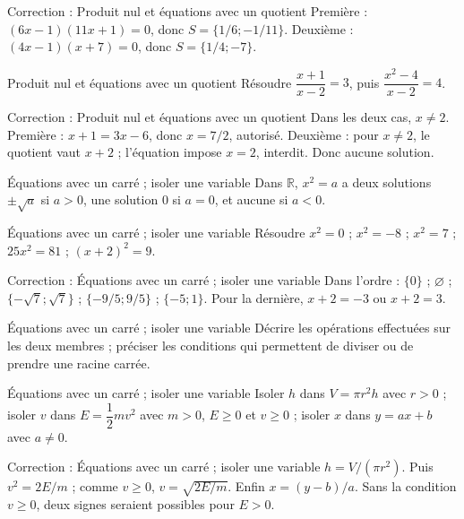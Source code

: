 \documentclass[aspectratio=169,10pt]{beamer}
\providecommand{\R}{\mathbb{R}}
\begin{document}
\begin{frame}{Correction : Produit nul et équations avec un quotient}
Première : \((6x-1)(11x+1)=0\), donc \(S=\{1/6;-1/11\}\). Deuxième : \((4x-1)(x+7)=0\), donc \(S=\{1/4;-7\}\).
\end{frame}
\begin{frame}{Produit nul et équations avec un quotient}
Résoudre \(\dfrac{x+1}{x-2}=3\), puis \(\dfrac{x^2-4}{x-2}=4\).
\end{frame}
\begin{frame}{Correction : Produit nul et équations avec un quotient}
Dans les deux cas, \(x\ne2\). Première : \(x+1=3x-6\), donc \(x=7/2\), autorisé. Deuxième : pour \(x\ne2\), le quotient vaut \(x+2\) ; l'équation impose \(x=2\), interdit. Donc aucune solution.
\end{frame}
\begin{frame}{Équations avec un carré ; isoler une variable}
Dans \(\R\), \(x^2=a\) a deux solutions \(\pm\sqrt a\) si \(a>0\), une solution \(0\) si \(a=0\), et aucune si \(a<0\).
\end{frame}
\begin{frame}{Équations avec un carré ; isoler une variable}
Résoudre \(x^2=0\) ; \(x^2=-8\) ; \(x^2=7\) ; \(25x^2=81\) ; \((x+2)^2=9\).
\end{frame}
\begin{frame}{Correction : Équations avec un carré ; isoler une variable}
Dans l'ordre : \(\{0\}\) ; \(\varnothing\) ; \(\{-\sqrt7;\sqrt7\}\) ; \(\{-9/5;9/5\}\) ; \(\{-5;1\}\). Pour la dernière, \(x+2=-3\) ou \(x+2=3\).
\end{frame}
\begin{frame}{Équations avec un carré ; isoler une variable}
Décrire les opérations effectuées sur les deux membres ; préciser les conditions qui permettent de diviser ou de prendre une racine carrée.
\end{frame}
\begin{frame}{Équations avec un carré ; isoler une variable}
Isoler \(h\) dans \(V=\pi r^2h\) avec \(r>0\) ; isoler \(v\) dans \(E=\dfrac12mv^2\) avec \(m>0\), \(E\geq0\) et \(v\geq0\) ; isoler \(x\) dans \(y=ax+b\) avec \(a\ne0\).
\end{frame}
\begin{frame}{Correction : Équations avec un carré ; isoler une variable}
\(h=V/(\pi r^2)\). Puis \(v^2=2E/m\) ; comme \(v\geq0\), \(v=\sqrt{2E/m}\). Enfin \(x=(y-b)/a\). Sans la condition \(v\geq0\), deux signes seraient possibles pour \(E>0\).
\end{frame}
\end{document}
